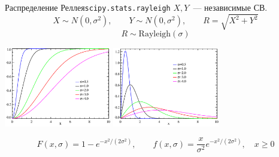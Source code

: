 \documentclass[11pt,pdf,utf8,hyperref={unicode},aspectratio=169]{beamer}
\begin{document}
\begin{frame}{Распределение Реллея}{\texttt{scipy.stats.rayleigh}}
$X,Y$~--- независимые СВ.
$$
X\sim N(0,\sigma^2),\qquad Y\sim N(0,\sigma^2), \qquad R=\sqrt{X^2+Y^2}
$$
$$
    R\sim \mathrm {Rayleigh} (\sigma )
$$
\begin{center}
    \includegraphics[width=0.35\textwidth]{RayleighCDF.png}      \includegraphics[width=0.35\textwidth]{RayleighPDF.png}
\end{center}
$$
F(x, \sigma )=1-e^{-x^{2}/(2\sigma^{2})},\qquad f(x,\sigma )={\frac {x}{\sigma ^{2}}}e^{-x^{2}/(2\sigma ^{2})},\quad x\geqslant 0
$$


\end{frame}
\end{document}
